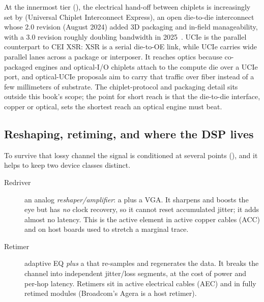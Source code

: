  At the innermost tier
(), the electrical hand-off between chiplets is increasingly set
by  (Universal Chiplet Interconnect Express), an open
die-to-die interconnect whose 2.0 revision (August 2024) added 3D packaging and
in-field manageability, with a 3.0 revision roughly doubling bandwidth in
2025~. UCIe is the parallel counterpart to CEI XSR: XSR is a serial
die-to-OE link, while UCIe carries wide parallel lanes across a package or interposer.
It reaches optics because co-packaged engines and optical-I/O chiplets attach to the
compute die over a UCIe port, and optical-UCIe proposals aim to carry that traffic
over fiber instead of a few millimeters of substrate. The chiplet-protocol and
packaging detail sits outside this book's scope; the point for short reach is that the
die-to-die interface, copper or optical, sets the shortest reach an optical engine
must beat.

\subsection{Reshaping, retiming, and where the DSP lives}
\label{sec:conditioning}

To survive that lossy channel the signal is conditioned at several points
(), and it helps to keep two device classes distinct.

\begin{description}
\item[Redriver] an analog \emph{reshaper/amplifier}: a  plus a VGA. It sharpens and boosts the eye but has
      \emph{no} clock recovery, so it cannot reset accumulated jitter; it adds
      almost no latency. This is the active element in active copper cables (ACC)
      and on host boards used to stretch a marginal trace.
\item[Retimer] adaptive EQ \emph{plus} a  that re-samples and regenerates the
      data. It breaks the channel into independent jitter/loss segments, at the
      cost of power and per-hop latency. Retimers sit in active electrical cables
      (AEC) and in fully retimed modules (Broadcom's Agera is a host retimer).
\end{description}

